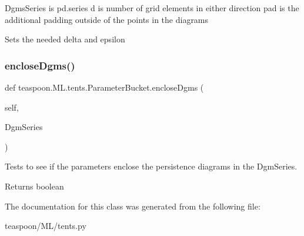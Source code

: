 \begin{DoxyVerb}DgmsSeries is pd.series
d is number of grid elements in either direction
pad is the additional padding outside of the points in the diagrams

Sets the needed delta and epsilon \end{DoxyVerb}
 \mbox{\label{classteaspoon_1_1_m_l_1_1tents_1_1_parameter_bucket_afbc1ce46c67e2a86a72d93cdcba558ea}} 
\subsubsection{\texorpdfstring{enclose\+Dgms()}{encloseDgms()}}
{\footnotesize\ttfamily def teaspoon.\+M\+L.\+tents.\+Parameter\+Bucket.\+enclose\+Dgms (\begin{DoxyParamCaption}\item[{}]{self,  }\item[{}]{Dgm\+Series }\end{DoxyParamCaption})}



Tests to see if the parameters enclose the persistence diagrams in the Dgm\+Series. 

\begin{DoxyReturn}{Returns}
boolean 
\end{DoxyReturn}


The documentation for this class was generated from the following file\+:\begin{DoxyCompactItemize}
\item 
teaspoon/\+M\+L/tents.\+py\end{DoxyCompactItemize}
